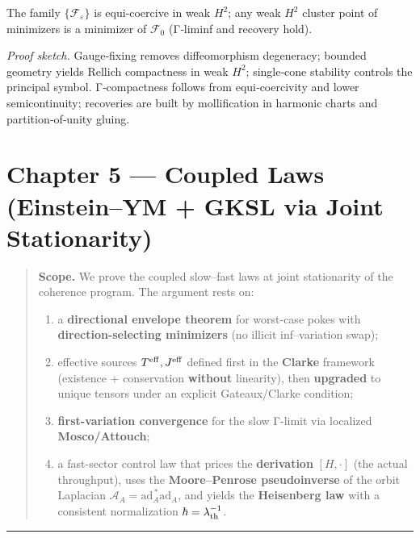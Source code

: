 \documentclass[
]{article}
\providecommand{\tightlist}{%
  \setlength{\itemsep}{0pt}\setlength{\parskip}{0pt}}
\numberwithin{equation}{section}
\begin{document}
The family \(\{\mathcal F_\varepsilon\}\) is equi‑coercive in weak
\(H^2\); any weak \(H^2\) cluster point of minimizers is a minimizer of
\(\mathcal F_0\) (Γ‑liminf and recovery hold).

\emph{Proof sketch.} Gauge‑fixing removes diffeomorphism degeneracy;
bounded geometry yields Rellich compactness in weak \(H^2\); single‑cone
stability controls the principal symbol. Γ‑compactness follows from
equi‑coercivity and lower semicontinuity; recoveries are built by
mollification in harmonic charts and partition‑of‑unity gluing.

\hypertarget{chapter-5-coupled-laws-einsteinym-gksl-via-joint-stationarity}{%
\section{Chapter 5 --- Coupled Laws (Einstein--YM + GKSL via Joint
Stationarity)}\label{chapter-5-coupled-laws-einsteinym-gksl-via-joint-stationarity}}

\begin{quote}
\textbf{Scope.} We prove the coupled slow--fast laws at joint
stationarity of the coherence program. The argument rests on:

\begin{enumerate}
\def\labelenumi{\arabic{enumi}.}
\tightlist
\item
  a \textbf{directional envelope theorem} for worst-case pokes with
  \textbf{direction-selecting minimizers} (no illicit inf--variation
  swap);
\item
  effective sources \(T^{\rm eff},J^{\rm eff}\) defined first in the
  \textbf{Clarke} framework (existence + conservation \textbf{without}
  linearity), then \textbf{upgraded} to unique tensors under an explicit
  Gateaux/Clarke condition;
\item
  \textbf{first-variation convergence} for the slow Γ-limit via
  localized \textbf{Mosco/Attouch};
\item
  a fast-sector control law that prices the \textbf{derivation}
  \([H,\cdot]\) (the actual throughput), uses the \textbf{Moore--Penrose
  pseudoinverse} of the orbit Laplacian
  \(\mathcal A_A=\mathrm{ad}_A^{\,*}\mathrm{ad}_A\), and yields the
  \textbf{Heisenberg law} with a consistent normalization
  \(\hbar=\lambda_{\rm th}^{-1}\).
\end{enumerate}
\end{quote}

\begin{center}\rule{0.5\linewidth}{0.5pt}\end{center}
\end{document}
